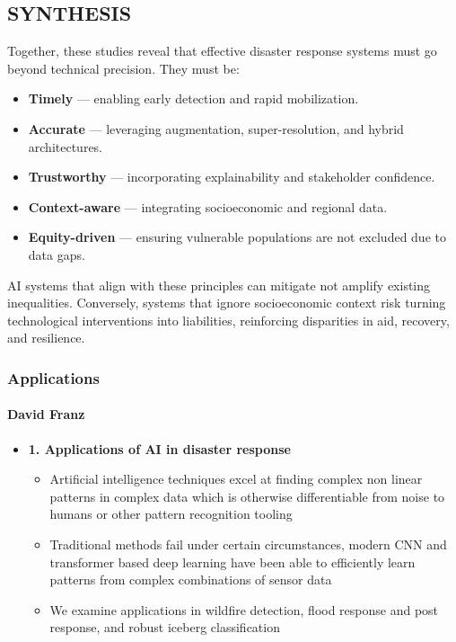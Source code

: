 \documentclass{beamer}
\newcommand{\namedframe}[3]{
  \begin{frame}
    \frametitle{#2}
    \framesubtitle{#1}
    #3
  \end{frame}
}
\begin{document}
{\subsection{SYNTHESIS}
Together, these studies reveal that effective disaster response systems must go beyond technical precision. They must be:
\begin{itemize}
    \item \textbf{Timely} — enabling early detection and rapid mobilization.
    \item \textbf{Accurate} — leveraging augmentation, super-resolution, and hybrid architectures.
    \item \textbf{Trustworthy} — incorporating explainability and stakeholder confidence.
    \item \textbf{Context-aware} — integrating socioeconomic and regional data.
    \item \textbf{Equity-driven} — ensuring vulnerable populations are not excluded due to data gaps.
\end{itemize}
AI systems that align with these principles can mitigate not amplify existing inequalities. Conversely, systems that ignore socioeconomic context risk turning technological interventions into liabilities, reinforcing disparities in aid, recovery, and resilience.
}


\namedframe{David Franz}{Applications}{
\begin{itemize}
    \item \textbf{1. Applications of AI in disaster response}
    \begin{itemize}
        \item Artificial intelligence techniques excel at finding complex non linear patterns in complex data which is otherwise differentiable from noise to humans or other pattern recognition tooling
        \item Traditional methods fail under certain circumstances, modern CNN and transformer based deep learning have been able to efficiently learn patterns from complex combinations of sensor data
        \item We examine applications in wildfire detection, flood response and post response, and robust iceberg classification
    \end{itemize}
\end{itemize}
}
\end{document}

